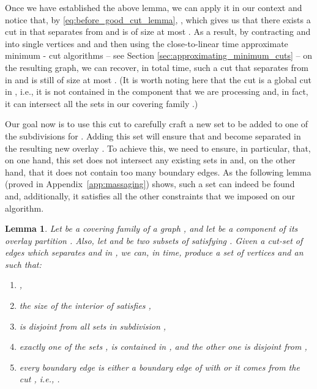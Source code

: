 \documentclass[11pt, letterpaper]{article}
\newtheorem{lemma}[theorem]{Lemma}
\begin{document}
Once we have established the above lemma, we can apply it in our context and notice that, by \eqref{eq:before_good_cut_lemma}, , which gives us that there exists a cut  in  that separates  from  and is of size at most . As a result, by contracting  and  into single vertices  and  and then using the close-to-linear time approximate minimum - cut algorithms -- see Section \ref{sec:approximating_minimum_cuts} -- on the resulting graph, we can recover, in total  time, such a cut  that separates  from  in  and is still of size at most . (It is worth noting here that the cut  is a global cut in , i.e., it is not contained in the component  that we are processing and, in fact, it can intersect all the sets in our covering family .)  

Our goal now is to use this cut  to carefully craft a new set  to be added to one of the subdivisions  for . Adding this set will ensure that  and  become separated in the resulting new overlay . To achieve this, we need to ensure, in particular, that, on one hand, this set does not intersect any existing sets in  and, on the other hand, that it does not contain too many boundary edges. As the following lemma (proved in Appendix~\ref{app:massaging}) shows, such a set  can indeed be found and, additionally, it satisfies all the other constraints that we imposed on our algorithm. 

\begin{lemma} \label{lem:massaging}
Let  be a covering family of a graph , and let  be a component of its overlay partition . Also, let  and  be two subsets of  satisfying . Given a cut-set of edges  which separates  and  in , we can, in  time, produce a set of vertices  and an  such that:
\vspace{-7pt}
\begin{enumerate}[(1)]\addtolength{\itemsep}{-.5\baselineskip}
	\item , \label{cond:i_0_ell}
	\item the size of the interior of  satisfies , \label{cond:size}
	\item  is disjoint from all sets in subdivision , \label{cond:disjoint}
	\item exactly one of the sets ,  is contained in , and the other one is disjoint from , \label{cond:separation}
	\item every boundary edge  is either a boundary edge of  with  or it comes from the cut , i.e., . \label{cond:boundary_edges}
\end{enumerate}
\end{lemma}
\end{document}
